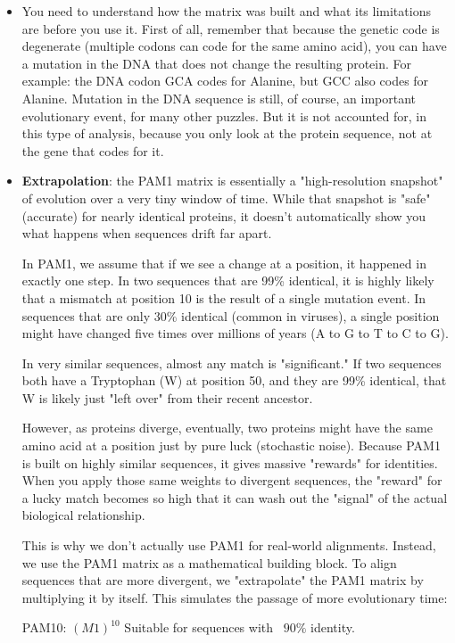\begin{itemize}
\item You need to understand how the matrix was built and what its limitations are before you use it. First of all, 
remember that because the genetic code is degenerate (multiple codons can code for the same amino acid), you can have a mutation in the DNA that does not change the resulting protein.
For example: the DNA codon GCA codes for Alanine, but GCC also codes for Alanine.
Mutation in the DNA sequence is still, of course, an important evolutionary event, for many other puzzles. But it is not accounted for, in this type of analysis, because you only look 
at the protein sequence, not at the gene that codes for it.
\item \textbf{Extrapolation}: the PAM1 matrix is essentially a "high-resolution snapshot" of evolution over a very tiny window of time. While that snapshot is "safe" (accurate) for nearly identical proteins, it doesn't automatically show you what happens when sequences drift far apart.

In PAM1, we assume that if we see a change at a position, it happened in exactly one step. In two sequences that are 99\% identical, it is highly likely that a mismatch at position 10 is the result of a single mutation event.
In sequences that are only 30\% identical (common in viruses), a single position might have changed five times over millions of years (A to G to T to C to G).



In very similar sequences, almost any match is "significant." If two sequences both have a Tryptophan (W) at position 50, and they are 99\% identical, that W is likely just "left over" from their recent ancestor.

However, as proteins diverge, eventually, two proteins might have the same amino acid at a position just by pure luck (stochastic noise). Because PAM1 is built on highly similar sequences, it gives massive "rewards" for identities. When you apply those same weights to divergent sequences, the "reward" for a lucky match becomes so high that it can wash out the "signal" of the actual biological relationship.

This is why we don't actually use PAM1 for real-world alignments. Instead, we use the PAM1 matrix as a mathematical building block.
To align sequences that are more divergent, we "extrapolate" the PAM1 matrix by multiplying it by itself. This simulates the passage of more evolutionary time:

PAM10: $(M1)^{10}$ Suitable for sequences with ~$90\%$ identity.


\end{itemize}
